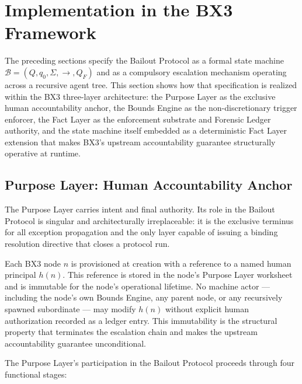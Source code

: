 \section{Implementation in the BX3 Framework}\label{sec:implementation}

The preceding sections specify the Bailout Protocol as a formal state machine $\mathcal{B} = (Q, q_0, \Sigma, \rightarrow, Q_F)$ and as a compulsory escalation mechanism operating across a recursive agent tree. This section shows how that specification is realized within the BX3 three-layer architecture: the Purpose Layer as the exclusive human accountability anchor, the Bounds Engine as the non-discretionary trigger enforcer, the Fact Layer as the enforcement substrate and Forensic Ledger authority, and the state machine itself embedded as a deterministic Fact Layer extension that makes BX3's upstream accountability guarantee structurally operative at runtime.

\subsection{Purpose Layer: Human Accountability Anchor}\label{sec:purpose-layer}

The Purpose Layer carries intent and final authority. Its role in the Bailout Protocol is singular and architecturally irreplaceable: it is the exclusive terminus for all exception propagation and the only layer capable of issuing a binding resolution directive that closes a protocol run.

Each BX3 node $n$ is provisioned at creation with a reference to a named human principal $h(n)$. This reference is stored in the node's Purpose Layer worksheet and is immutable for the node's operational lifetime. No machine actor --- including the node's own Bounds Engine, any parent node, or any recursively spawned subordinate --- may modify $h(n)$ without explicit human authorization recorded as a ledger entry. This immutability is the structural property that terminates the escalation chain and makes the upstream accountability guarantee unconditional.

The Purpose Layer's participation in the Bailout Protocol proceeds through four functional stages:


